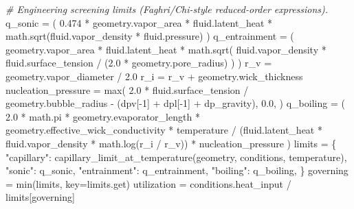 \documentclass[
  12pt,
  12pt,a4paper,oneside]{report}
\newenvironment{Shaded}{}{}
\newcommand{\BuiltInTok}[1]{\textcolor[rgb]{0.00,0.50,0.00}{#1}}
\newcommand{\CommentTok}[1]{\textcolor[rgb]{0.38,0.63,0.69}{\textit{#1}}}
\newcommand{\DecValTok}[1]{\textcolor[rgb]{0.25,0.63,0.44}{#1}}
\newcommand{\FloatTok}[1]{\textcolor[rgb]{0.25,0.63,0.44}{#1}}
\newcommand{\NormalTok}[1]{#1}
\newcommand{\OperatorTok}[1]{\textcolor[rgb]{0.40,0.40,0.40}{#1}}
\newcommand{\StringTok}[1]{\textcolor[rgb]{0.25,0.44,0.63}{#1}}
\begin{document}
\begin{Shaded}
\begin{Highlighting}[]
    \CommentTok{\# Engineering screening limits (Faghri/Chi{-}style reduced{-}order expressions).}
\NormalTok{    q\_sonic }\OperatorTok{=}\NormalTok{ (}
        \FloatTok{0.474} \OperatorTok{*}\NormalTok{ geometry.vapor\_area }\OperatorTok{*}\NormalTok{ fluid.latent\_heat}
        \OperatorTok{*}\NormalTok{ math.sqrt(fluid.vapor\_density }\OperatorTok{*}\NormalTok{ fluid.pressure)}
\NormalTok{    )}
\NormalTok{    q\_entrainment }\OperatorTok{=}\NormalTok{ (}
\NormalTok{        geometry.vapor\_area }\OperatorTok{*}\NormalTok{ fluid.latent\_heat}
        \OperatorTok{*}\NormalTok{ math.sqrt(}
\NormalTok{            fluid.vapor\_density }\OperatorTok{*}\NormalTok{ fluid.surface\_tension}
            \OperatorTok{/}\NormalTok{ (}\FloatTok{2.0} \OperatorTok{*}\NormalTok{ geometry.pore\_radius)}
\NormalTok{        )}
\NormalTok{    )}
\NormalTok{    r\_v }\OperatorTok{=}\NormalTok{ geometry.vapor\_diameter }\OperatorTok{/} \FloatTok{2.0}
\NormalTok{    r\_i }\OperatorTok{=}\NormalTok{ r\_v }\OperatorTok{+}\NormalTok{ geometry.wick\_thickness}
\NormalTok{    nucleation\_pressure }\OperatorTok{=} \BuiltInTok{max}\NormalTok{(}
        \FloatTok{2.0} \OperatorTok{*}\NormalTok{ fluid.surface\_tension }\OperatorTok{/}\NormalTok{ geometry.bubble\_radius}
        \OperatorTok{{-}}\NormalTok{ (dpv[}\OperatorTok{{-}}\DecValTok{1}\NormalTok{] }\OperatorTok{+}\NormalTok{ dpl[}\OperatorTok{{-}}\DecValTok{1}\NormalTok{] }\OperatorTok{+}\NormalTok{ dp\_gravity),}
        \FloatTok{0.0}\NormalTok{,}
\NormalTok{    )}
\NormalTok{    q\_boiling }\OperatorTok{=}\NormalTok{ (}
        \FloatTok{2.0} \OperatorTok{*}\NormalTok{ math.pi }\OperatorTok{*}\NormalTok{ geometry.evaporator\_length}
        \OperatorTok{*}\NormalTok{ geometry.effective\_wick\_conductivity }\OperatorTok{*}\NormalTok{ temperature}
        \OperatorTok{/}\NormalTok{ (fluid.latent\_heat }\OperatorTok{*}\NormalTok{ fluid.vapor\_density }\OperatorTok{*}\NormalTok{ math.log(r\_i }\OperatorTok{/}\NormalTok{ r\_v))}
        \OperatorTok{*}\NormalTok{ nucleation\_pressure}
\NormalTok{    )}
\NormalTok{    limits }\OperatorTok{=}\NormalTok{ \{}
        \StringTok{"capillary"}\NormalTok{: capillary\_limit\_at\_temperature(geometry, conditions, temperature),}
        \StringTok{"sonic"}\NormalTok{: q\_sonic,}
        \StringTok{"entrainment"}\NormalTok{: q\_entrainment,}
        \StringTok{"boiling"}\NormalTok{: q\_boiling,}
\NormalTok{    \}}
\NormalTok{    governing }\OperatorTok{=} \BuiltInTok{min}\NormalTok{(limits, key}\OperatorTok{=}\NormalTok{limits.get)}
\NormalTok{    utilization }\OperatorTok{=}\NormalTok{ conditions.heat\_input }\OperatorTok{/}\NormalTok{ limits[governing]}

\end{Highlighting}
\end{Shaded}
\end{document}
